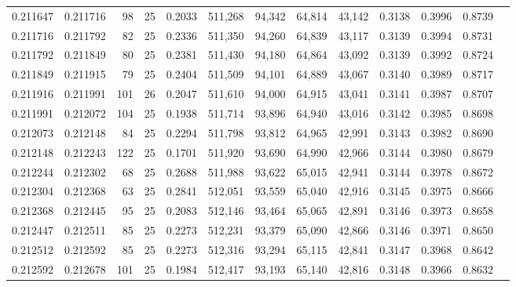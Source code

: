 \begin{tabular}{rrrrrrrrrrrrr}
0.211647 & 0.211716 &    98 &  25 &                                     0.2033 & 511,268 &  94,342 &  64,814 &  43,142 & 0.3138 & 0.3996 & 0.8739 \\
0.211716 & 0.211792 &    82 &  25 &                                     0.2336 & 511,350 &  94,260 &  64,839 &  43,117 & 0.3139 & 0.3994 & 0.8731 \\
0.211792 & 0.211849 &    80 &  25 &                                     0.2381 & 511,430 &  94,180 &  64,864 &  43,092 & 0.3139 & 0.3992 & 0.8724 \\
0.211849 & 0.211915 &    79 &  25 &                                     0.2404 & 511,509 &  94,101 &  64,889 &  43,067 & 0.3140 & 0.3989 & 0.8717 \\
0.211916 & 0.211991 &   101 &  26 &                                     0.2047 & 511,610 &  94,000 &  64,915 &  43,041 & 0.3141 & 0.3987 & 0.8707 \\
0.211991 & 0.212072 &   104 &  25 &                                     0.1938 & 511,714 &  93,896 &  64,940 &  43,016 & 0.3142 & 0.3985 & 0.8698 \\
0.212073 & 0.212148 &    84 &  25 &                                     0.2294 & 511,798 &  93,812 &  64,965 &  42,991 & 0.3143 & 0.3982 & 0.8690 \\
0.212148 & 0.212243 &   122 &  25 &                                     0.1701 & 511,920 &  93,690 &  64,990 &  42,966 & 0.3144 & 0.3980 & 0.8679 \\
0.212244 & 0.212302 &    68 &  25 &                                     0.2688 & 511,988 &  93,622 &  65,015 &  42,941 & 0.3144 & 0.3978 & 0.8672 \\
0.212304 & 0.212368 &    63 &  25 &                                     0.2841 & 512,051 &  93,559 &  65,040 &  42,916 & 0.3145 & 0.3975 & 0.8666 \\
0.212368 & 0.212445 &    95 &  25 &                                     0.2083 & 512,146 &  93,464 &  65,065 &  42,891 & 0.3146 & 0.3973 & 0.8658 \\
0.212447 & 0.212511 &    85 &  25 &                                     0.2273 & 512,231 &  93,379 &  65,090 &  42,866 & 0.3146 & 0.3971 & 0.8650 \\
0.212512 & 0.212592 &    85 &  25 &                                     0.2273 & 512,316 &  93,294 &  65,115 &  42,841 & 0.3147 & 0.3968 & 0.8642 \\
0.212592 & 0.212678 &   101 &  25 &                                     0.1984 & 512,417 &  93,193 &  65,140 &  42,816 & 0.3148 & 0.3966 & 0.8632 \\

\end{tabular}

